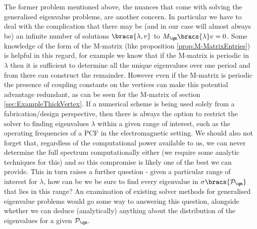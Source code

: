 The former problem mentioned above, the nuances that come with solving the generalised eigenvalue problems, are another concern.
In particular we have to deal with the complication that there may be (and in our case will almost always be) an infinite number of solutions $\bracs{\lambda,v}$ to $M_{\qm}\bracs{\lambda} v = 0$.
Some knowledge of the form of the M-matrix (like proposition \ref{prop:M-MatrixEntries}) is helpful in this regard, for example we know that if the M-matrix is periodic in $\lambda$ then it is sufficient to determine all the unique eigenvalues over one period and from there can construct the remainder.
However even if the M-matrix is periodic the presence of coupling constants on the vertices can make this potential advantage redundant, as can be seen for the M-matrix of section \ref{sec:ExampleThickVertex}.
If a numerical scheme is being used solely from a fabrication/design perspective, then there is always the option to restrict the solver to finding eigenvalues $\lambda$ within a given range of interest, such as the operating frequencies of a PCF in the electromagnetic setting.
We should also not forget that, regardless of the computational power available to us, we can never determine the full spectrum computationally either (we require some analytic techniques for this) and so this compromise is likely one of the best we can provide.
This in turn raises a further question - given a particular range of interest for $\lambda$, how can be we be sure to find every eigenvalue in $\sigma\bracs{\mathcal{P}_{\qm}}$ that lies in this range?
An examination of existing solver methods for generalised eigenvalue problems would go some way to answering this question, alongside whether we can deduce (analytically) anything about the distribution of the eigenvalues for a given $\mathcal{P}_{\qm}$.

